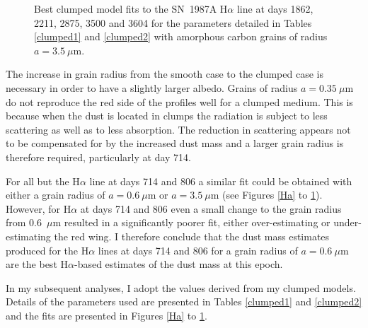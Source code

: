 \begin{figure}
\vspace{8mm}
\caption{Best clumped model fits to the SN~1987A H$\alpha$ line at days 1862, 2211, 2875, 3500 and 3604 for the parameters detailed in Tables \ref{clumped1} and \ref{clumped2} with amorphous carbon grains of radius $a=3.5~\mu$m.}
\label{d1862_3604_2}
\end{figure}

The increase in grain radius from the smooth case to the clumped case is 
necessary in order to have a slightly larger albedo.  Grains of radius 
$a=0.35~\mu$m do not reproduce the red side of the profiles well for a 
clumped medium.  This is because when the dust is located in clumps the 
radiation is subject to less scattering as well as to less absorption.  
The reduction in scattering appears not to be compensated for by the 
increased dust mass and a larger grain radius is therefore required, 
particularly at day 714.

For all but the H$\alpha$ line at days 714 and 806 a similar fit could be 
obtained with either a grain radius of $a=0.6~\mu$m or $a=3.5~\mu$m (see 
Figures \ref{Ha} to \ref{d1862_3604_2}).  However, for H$\alpha$ 
at days 714 and 806 even a small change to the grain radius from 0.6~$\mu$m resulted in a 
significantly poorer fit, either over-estimating or under-estimating the red wing. 
I therefore conclude that the dust mass estimates produced for the 
H$\alpha$ lines at days 714 and 806 for a grain radius of $a=0.6~\mu$m are 
the best H$\alpha$-based estimates of the dust mass at this epoch.



In my subsequent analyses, I adopt the values derived from my clumped 
models.  Details of the parameters used are presented in 
Tables \ref{clumped1} and \ref{clumped2} and the fits are presented in Figures 
\ref{Ha} to \ref{d1862_3604_2}.

